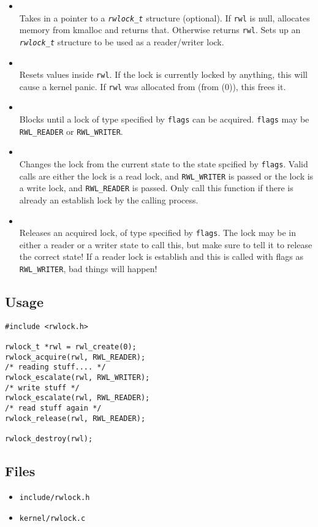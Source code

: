 \begin{itemize}
\item {} \\
Takes in a pointer to a \texttt{\textit{rwlock\_t}} structure (optional). If \texttt{rwl} is null, allocates
memory from kmalloc and returns that. Otherwise returns \texttt{rwl}. Sets up an \texttt{\textit{rwlock\_t}}
structure to be used as a reader/writer lock.

\item {} \\
Resets values inside \texttt{rwl}. If the lock is currently locked by anything,
this will cause a kernel panic. If \texttt{rwl} was allocated from  (from (0)), this frees it.

\item {} \\
Blocks until a lock of type specified by \texttt{flags} can be acquired. \texttt{flags} may
be \texttt{RWL\_READER} or \texttt{RWL\_WRITER}. 
\item {} \\
Changes the lock from the current state to the state spcified by \texttt{flags}. Valid calls are either
the lock is a read lock, and \texttt{RWL\_WRITER} is passed or the lock is a write lock, and \texttt{RWL\_READER}
is passed. Only call this function if there is already an establish lock by the calling process.
\item {} \\
Releases an acquired lock, of type specified by \texttt{flags}. The lock may be in either a reader or a writer state to call this, but
make sure to tell it to release the correct state! If a reader lock is establish and this is called
with flags as \texttt{RWL\_WRITER}, bad things will happen!
\end{itemize}

\subsection{Usage}
\begin{lstlisting}
#include <rwlock.h>

rwlock_t *rwl = rwl_create(0);
rwlock_acquire(rwl, RWL_READER);
/* reading stuff.... */
rwlock_escalate(rwl, RWL_WRITER);
/* write stuff */
rwlock_escalate(rwl, RWL_READER);
/* read stuff again */
rwlock_release(rwl, RWL_READER);

rwlock_destroy(rwl);
\end{lstlisting}
\subsection{Files}
\begin{itemize}
\item \texttt{include/rwlock.h}
\item \texttt{kernel/rwlock.c}
\end{itemize}
